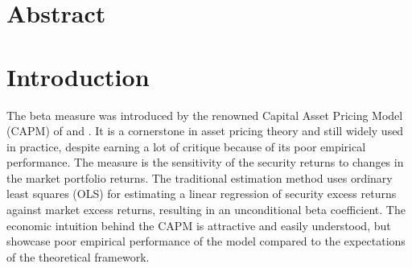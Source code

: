\documentclass[11pt,a4paper]{article}
\begin{document}



\section*{Abstract}
\begin{doublespacing}

\end{doublespacing}


\newpage



\newpage
\tableofcontents

\newpage

\listoffigures
\vspace{10mm}
\listoftables


\newpage
{}
\setlength{\parskip}{0.4cm} 




\section{Introduction}

The beta measure was introduced by the renowned Capital Asset Pricing Model (CAPM) of  and . It is a cornerstone in asset pricing theory and still widely used in practice, despite earning a lot of critique because of its poor empirical performance. The measure is the sensitivity of the security returns to changes in the market portfolio returns. The traditional estimation method uses ordinary least squares (OLS) for estimating a linear regression of security excess returns against market excess returns, resulting in an unconditional beta coefficient. The economic intuition behind the CAPM is attractive and easily understood, but  showcase poor empirical performance of the model compared to the expectations of the theoretical framework.
\end{document}
